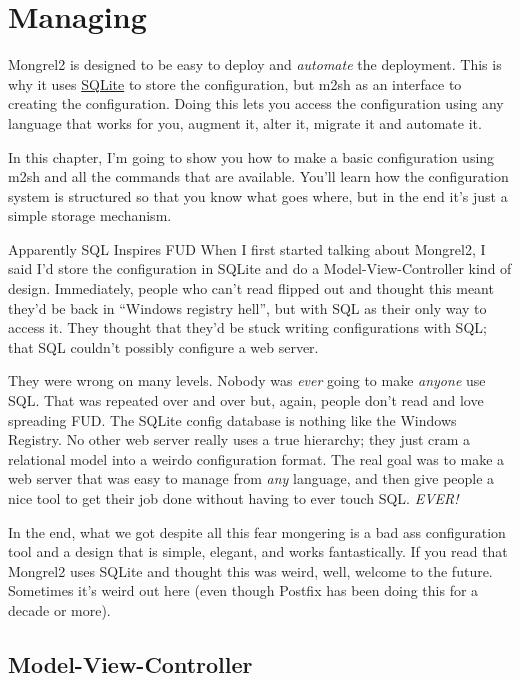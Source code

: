 \chapter{Managing}

Mongrel2 is designed to be easy to deploy and \emph{automate} the deployment.
This is why it uses \href{http://www.sqlite.org/}{SQLite} to store the configuration,
but m2sh as an interface to creating the configuration.  Doing this lets
you access the configuration using any language that works for you, augment it,
alter it, migrate it and automate it.

In this chapter, I'm going to show you how to make a basic configuration using
m2sh and all the commands that are available.  You'll learn how the configuration
system is structured so that you know what goes where, but in the end it's just
a simple storage mechanism.

\begin{aside}{Apparently SQL Inspires FUD}
When I first started talking about Mongrel2, I said I'd store the configuration
in SQLite and do a Model-View-Controller kind of design.  Immediately, people who
can't read flipped out and thought this meant they'd be back in ``Windows registry hell'',
but with SQL as their only way to access it.  They thought that they'd be stuck writing
configurations with SQL; that SQL couldn't possibly configure a web server.

They were wrong on many levels.  Nobody was \emph{ever} going to make \emph{anyone} use
SQL.  That was repeated over and over but, again, people don't read and love spreading
FUD.  The SQLite config database is nothing like the Windows Registry.  No other web
server really uses a true hierarchy; they just cram a relational model into a weirdo
configuration format.  The real goal was to make a web server that was easy to manage from
\emph{any} language, and then give people a nice tool to get their job done without
having to ever touch SQL.  \emph{EVER!}

In the end, what we got despite all this fear mongering is a bad ass configuration
tool and a design that is simple, elegant, and works fantastically.  If you read that
Mongrel2 uses SQLite and thought this was weird, well, welcome to the future.  Sometimes
it's weird out here (even though Postfix has been doing this for a decade or more).
\end{aside}


\section{Model-View-Controller}

